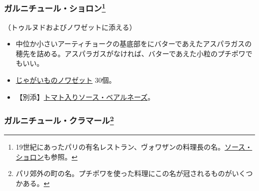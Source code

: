\begin{recette}
\atoaki{}

\hypertarget{garniture-choron}{%
\subsubsection[ガルニチュール・ショロン]{\texorpdfstring{ガルニチュール・ショロン\footnote{19世紀にあったパリの有名レストラン、ヴォワザンの料理長の名。\protect\hyperlink{sauce-bearnaise-tomatee}{ソース・ショロン}も参照。}}{ガルニチュール・ショロン}}\label{garniture-choron}}



（トゥルヌドおよびノワゼットに添える）

\begin{itemize}
\item
  中位か小さいアーティチョークの基底部をにバターであえたアスパラガスの穂先を詰める。アスパラガスがなければ、バターであえた小粒のプチポワでもいい。
\item
  \protect\hyperlink{pommes-de-terre-noisette}{じゃがいものノワゼット}
  30個。
\item
  【別添】\protect\hyperlink{sauce-bearnaise-tomatee}{トマト入りソース・ベアルネーズ}。
\end{itemize}

\atoaki{}

\hypertarget{garniture-clamart}{%
\subsubsection[ガルニチュール・クラマール]{\texorpdfstring{ガルニチュール・クラマール\footnote{パリ郊外の町の名。プチポワを使った料理にこの名が冠されるものがいくつかある。}}{ガルニチュール・クラマール}}\label{garniture-clamart}}




\end{recette}
